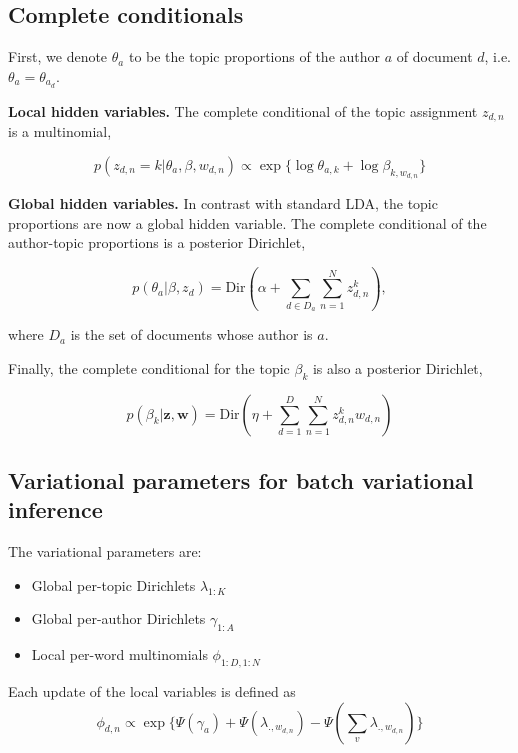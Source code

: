 \subsection{Complete conditionals}

First, we denote $\theta_a$ to be the topic proportions of the author $a$ of document $d$, i.e. $\theta_a = \theta_{a_d}$.

\textbf{Local hidden variables.} The complete conditional of the topic assignment $z_{d,n}$ is a multinomial,

\begin{equation}
p(z_{d,n} = k | \theta_a, \beta, w_{d,n}) \propto \exp \{ \log \theta_{a,k} + \log \beta_{k,w_{d,n}} \}
\end{equation}

\textbf{Global hidden variables.} In contrast with standard LDA, the topic proportions are now a global hidden variable.
The complete conditional of the author-topic proportions is a posterior Dirichlet,

\begin{equation}
p(\theta_a | \beta, z_{d}) = \text{Dir} ( \alpha + \sum_{d \in D_a}{\sum_{n=1}^{N}{z^k_{d,n}}}),
\end{equation}

\noindent where $D_a$ is the set of documents whose author is $a$.

Finally, the complete conditional for the topic $\beta_k$ is also a posterior Dirichlet,

\begin{equation}
p(\beta_k | \mathbf{z}, \mathbf{w}) = \text{Dir} ( \eta + \sum_{d=1}^{D}{\sum_{n=1}^{N}{z^k_{d,n}w_{d,n}}})
\end{equation}



\subsection{Variational parameters for batch variational inference}

The variational parameters are:
\begin{itemize}
	\item Global per-topic Dirichlets $\lambda_{1:K}$
	\item Global per-author Dirichlets $\gamma_{1:A}$
	\item Local per-word multinomials $\phi_{1:D,1:N}$
\end{itemize}

Each update of the local variables is defined as
\begin{equation}
\phi_{d,n} \propto \exp \{ \Psi(\gamma_a) + \Psi(\lambda_{.,w_{d,n}}) - \Psi(\sum_{v}{\lambda_{.,w_{d,n}}}) \}
\end{equation}

